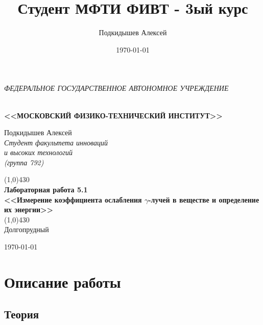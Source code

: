 \documentclass[a4paper,12pt]{article}
\author{Подкидышев Алексей}
\title{Студент МФТИ ФИВТ - 3ый курс}
\date{\today}
\theoremstyle{plain} %
\theoremstyle{definition} %
\theoremstyle{remark} %
\renewcommand{\headrulewidth}{0mm}  %
\begin{document}

\begin{center}
	\textit{\MakeTextUppercase{федеральное государственное автономное учреждение}}
		
	\vspace{0.5ex}
	
	\textbf{ \\ \MakeTextUppercase{<<Московский Физико-технический институт>>}}
\end{center}
\vspace{13ex}
\begin{flushright}
    \noindent
	{Подкидышев Алексей}
	\\
	\textit{Студент факультета инноваций\\ и высоких технологий\\(группа 792)}
\end{flushright}
\begin{center}
	\vspace{23ex}
	\line(1,0){430}\\[4ex]
	{\LARGE\textbf{Лабораторная работа 5.1}}
	\vspace{2ex}\\
	\textbf{\large{<<Измерение коэффициента ослабления $\gamma$-лучей в веществе и определение их энергии>>}}\\[3ex]
	\line(1,0){430}\\[5ex]
	\vfill
	Долгопрудный 
	
	{\today}
\end{center}

\newpage
\newpage
\renewcommand{\headrulewidth}{1pt}

\section{Описание работы}

\subsection{Теория}
\end{document}
